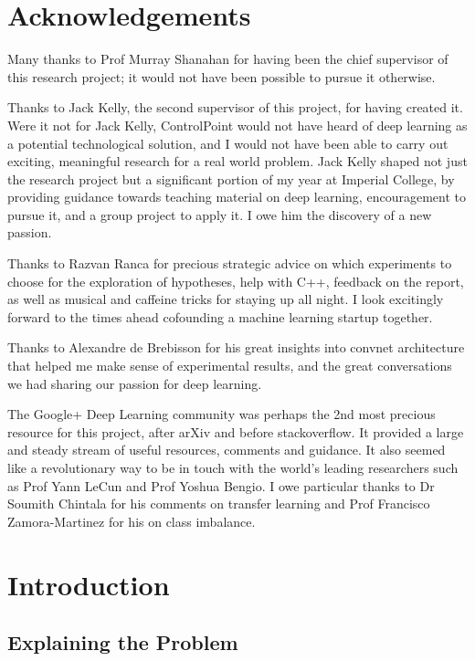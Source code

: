 \documentclass[a4paper,11pt]{article}
\begin{document}
\clearpage
\tableofcontents

\clearpage

\section{Acknowledgements}

Many thanks to Prof Murray Shanahan for having been the chief supervisor of this research project; it would not have been possible to pursue it otherwise. 

Thanks to Jack Kelly, the second supervisor of this project, for having created it. Were it not for Jack Kelly, ControlPoint would not have heard of deep learning as a potential technological solution, and I would not have been able to carry out exciting, meaningful research for a real world problem. Jack Kelly shaped not just the research project but a significant portion of my year at Imperial College, by providing guidance towards teaching material on deep learning, encouragement to pursue it, and a group project to apply it. I owe him the discovery of a new passion.

Thanks to Razvan Ranca for precious strategic advice on which experiments to choose for the exploration of hypotheses, help with C++, feedback on the report, as well as musical and caffeine tricks for staying up all night. I look excitingly forward to the times ahead cofounding a machine learning startup together.

Thanks to Alexandre de Brebisson for his great insights into convnet architecture that helped me make sense of experimental results, and the great conversations we had sharing our passion for deep learning.

The Google+ Deep Learning community was perhaps the 2nd most precious resource for this project, after arXiv and before stackoverflow. It provided a large and steady stream of useful resources, comments and guidance. It also seemed like a revolutionary way to be in touch with the world's leading researchers such as Prof Yann LeCun and Prof Yoshua Bengio. I owe particular thanks to Dr Soumith Chintala for his comments on transfer learning and Prof Francisco Zamora-Martinez for his on class imbalance.

\clearpage
\section{Introduction}

\subsection{Explaining the Problem}
\end{document}
